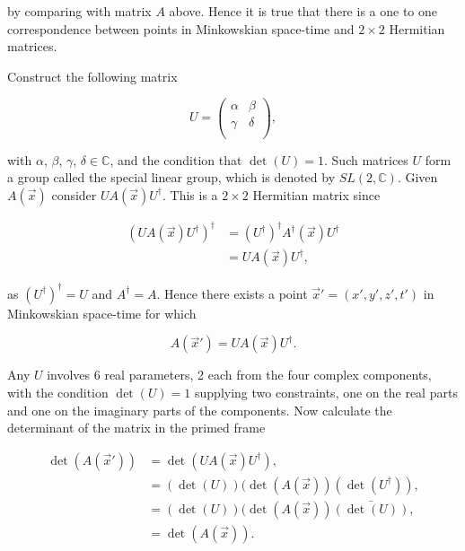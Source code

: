 \noindent by comparing with matrix $A$ above. Hence it is true that there is a one to one correspondence between points in Minkowskian space-time and $2 \times 2$ Hermitian matrices.

Construct the following matrix

\begin{equation*} 
U = \left( 
\begin{array}{cc}
\alpha & \beta \\
\gamma & \delta \\
\end{array}
\right),
\end{equation*}

\noindent with $\alpha$, $\beta$, $\gamma$, $\delta \in \mathbb{C}$, and the condition that $\det(U) = 1$. Such matrices $U$ form a group called the special linear group, which is denoted by $SL(2, \mathbb{C})$. Given $A(\vec{x})$ consider $U A(\vec{x}) U^{\dagger}$. This is a $2 \times 2$ Hermitian matrix since

\begin{align*}
(U A(\vec{x}) U^{\dagger})^{\dagger} & =  (U^{\dagger})^{\dagger} A^{\dagger}(\vec{x}) U^{\dagger} \\
                                     & = U A(\vec{x}) U^{\dagger},
\end{align*} 

\noindent as $(U^{\dagger})^{\dagger} = U$ and $A^{\dagger} = A$. Hence there exists a point $\vec{x}' = (x', y', z', t')$ in Minkowskian space-time for which

\begin{equation}\label{SL_trans}
A(\vec{x}') = U A(\vec{x}) U^{\dagger}.
\end{equation}

Any $U$ involves 6 real parameters, 2 each from the four complex components, with the condition $\det(U) = 1$ supplying two constraints, one on the real parts and one on the imaginary parts of the components. Now calculate the determinant of the matrix in the primed frame

\begin{align*}  
\det(A(\vec{x}')) & = \det(U A(\vec{x}) U^{\dagger}), \\
                  & = (\det(U))(\det(A(\vec{x}))(\det(U^{\dagger})), \\
                  & = (\det(U))(\det(A(\vec{x}))\bar{(\det(U))}, \\
                  & = \det(A(\vec{x})).
\end{align*}

